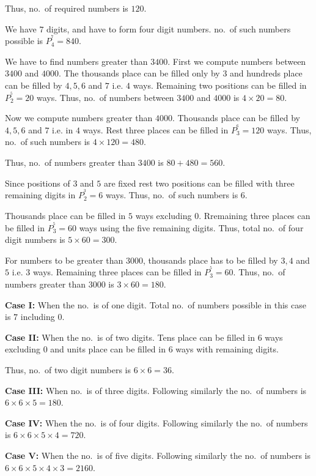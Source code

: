   Thus, no.\ of required numbers is $120$.
\item We have $7$ digits, and have to form four digit numbers. no.\ of such numbers possible is $P_4^^7 =
  840$.

  We have to find numbers greater than $3400$. First we compute numbers between $3400$ and $4000$. The
  thousands place can be filled only by $3$ and hundreds place can be filled by $4, 5, 6$ and $7$ i.e. $4$
  ways. Remaining two positions can be filled in $P_2^^5 = 20$ ways. Thus, no.\ of numbers between $3400$
  and $4000$ is $4\times20 = 80$.

  Now we compute numbers greater than $4000$. Thousands place can be filled by $4, 5, 6$ and $7$ i.e. in
  $4$ ways. Rest three places can be filled in $P_3^^6 = 120$ ways. Thus, no.\ of such numbers is $4\times120
  = 480$.

  Thus, no.\ of numbers greater than $3400$ is $80 + 480 = 560$.
\item Since positions of $3$ and $5$ are fixed rest two positions can be filled with three remaining digits
  in $P_2^^3 = 6$ ways. Thus, no.\ of such numbers is $6$.
\item Thousands place can be filled in $5$ ways excluding $0$. Rremaining three places can be filled in
  $P_3^^5 = 60$ ways using the five remaining digits. Thus, total no.\ of four digit numbers is $5\times60 =
  300$.

  For numbers to be greater than $3000$, thousands place has to be filled by $3, 4$ and $5$ i.e. $3$
  ways. Remaining three places can be filled in $P_3^^5 = 60$. Thus, no.\ of numbers greater than $3000$ is
  $3\times60 = 180$.
\item {\bf Case I:} When the no.\ is of one digit. Total no.\ of numbers possible in this case is $7$
  including $0$.

  {\bf Case II:} When the no.\ is of two digits. Tens place can be filled in $6$ ways excluding $0$ and units
  place can be filled in $6$ ways with remaining digits.

  Thus, no.\ of two digit numbers is $6\times6 = 36$.

  {\bf Case III:} When no.\ is of three digits. Following similarly the no.\ of numbers is $6\times6\times5 =
  180$.

  {\bf Case IV:} When the no.\ is of four digits. Following similarly the no.\ of numbers is
  $6\times6\times5\times4 = 720$.

  {\bf Case V:} When the no.\ is of five digits. Following similarly the no.\ of numbers is
  $6\times6\times5\times4\times3 = 2160$.

